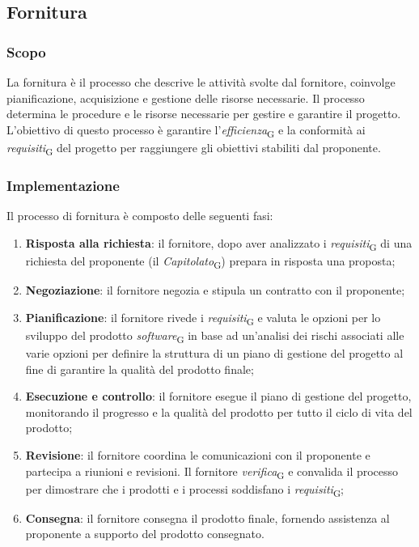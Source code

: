 \subsection{Fornitura}
\subsubsection{Scopo}
La fornitura è il processo che descrive le attività svolte dal fornitore, coinvolge pianificazione, acquisizione e gestione delle risorse necessarie. Il processo determina le procedure e le risorse necessarie per gestire e garantire il progetto. L'obiettivo di questo processo è garantire l'\textit{efficienza}\textsubscript{G} e la conformità ai \textit{requisiti}\textsubscript{G} del progetto per raggiungere gli obiettivi stabiliti dal proponente. 
\subsubsection{Implementazione}
Il processo di fornitura è composto delle seguenti fasi:
\begin{enumerate}
    \item \textbf{Risposta alla richiesta}: il fornitore, dopo aver analizzato i \textit{requisiti}\textsubscript{G} di una richiesta del proponente (il \textit{Capitolato}\textsubscript{G}) prepara in risposta una proposta;
    \item \textbf{Negoziazione}: il fornitore negozia e stipula un contratto con il proponente;
    \item \textbf{Pianificazione}: il fornitore rivede i \textit{requisiti}\textsubscript{G} e valuta le opzioni per lo sviluppo del prodotto \textit{software}\textsubscript{G} in base ad un'analisi dei rischi associati alle varie opzioni per definire la struttura di un piano di gestione del progetto al fine di garantire la qualità del prodotto finale;
    \item \textbf{Esecuzione e controllo}: il fornitore esegue il piano di gestione del progetto, monitorando il progresso e la qualità del prodotto per tutto il ciclo di vita del prodotto;
    \item \textbf{Revisione}: il fornitore coordina le comunicazioni con il proponente e partecipa a riunioni e revisioni. Il fornitore \textit{verifica}\textsubscript{G} e convalida il processo per dimostrare che i prodotti e i processi soddisfano i \textit{requisiti}\textsubscript{G};
    \item \textbf{Consegna}: il fornitore consegna il prodotto finale, fornendo assistenza al proponente a supporto del prodotto consegnato.
\end{enumerate}

